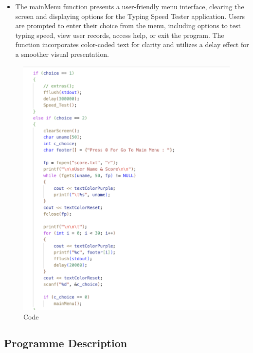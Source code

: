 \begin{itemize}

        \item The mainMenu function presents a user-friendly menu interface, clearing the screen and displaying options for the Typing Speed Tester application. Users are prompted to enter their choice from the menu, including options to test typing speed, view user records, access help, or exit the program. The function incorporates color-coded text for clarity and utilizes a delay effect for a smoother visual presentation.

\end{itemize}
\newpage
\begin{figure}[h]
     \includegraphics[scale=0.25]{CodeScreenShot/choice1-2.png}
    \caption{Code}
    \label{fig:code-screenshots}
\end{figure}

\subsection{Programme Description}

